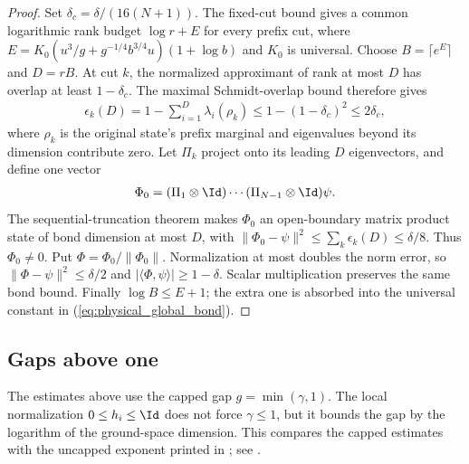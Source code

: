 \begin{proof}
    \leanok
    Set $\delta_c=\delta/(16(N+1))$.
    The fixed-cut bound gives a common logarithmic rank budget
    $\log r+E$ for every prefix cut, where
    $E=K_0(u^3/g+g^{-1/4}b^{3/4}u)(1+\log b)$ and $K_0$ is universal.
    Choose $B=\lceil e^E\rceil$ and $D=rB$.
    At cut $k$, the normalized approximant of rank at most $D$ has overlap
    at least $1-\delta_c$. The maximal Schmidt-overlap bound therefore gives
    \begin{align}
        \epsilon_k(D)=1-\sum_{i=1}^D\lambda_i(\rho_k)
        \le1-(1-\delta_c)^2\le2\delta_c,
        \label{eq:physical_global_prefix_tail}
    \end{align}
    where $\rho_k$ is the original state's prefix marginal and eigenvalues
    beyond its dimension contribute zero.
    Let $\Pi_k$ project onto its leading $D$ eigenvectors, and define one vector
    \begin{align}
        \Phi_0=(\Pi_1\otimes\Id)\cdots(\Pi_{N-1}\otimes\Id)\psi.
        \label{eq:physical_global_projection_product}
    \end{align}
    The sequential-truncation theorem makes $\Phi_0$ an open-boundary matrix
    product state of bond dimension at most $D$, with
    $\|\Phi_0-\psi\|^2\le\sum_k\epsilon_k(D)\le\delta/8$.
    Thus $\Phi_0\ne0$. Put $\Phi=\Phi_0/\|\Phi_0\|$.
    Normalization at most doubles the norm error, so
    $\|\Phi-\psi\|^2\le\delta/2$ and
    $|\langle\Phi,\psi\rangle|\ge1-\delta$.
    Scalar multiplication preserves the same bond bound.
    Finally $\log B\le E+1$; the extra one is absorbed into the universal
    constant in (\ref{eq:physical_global_bond}).
\end{proof}

\subsection{Gaps above one}
\label{sec:physical_dg_large_gap}

The estimates above use the capped gap $g=\min(\gamma,1)$. The local
normalization $0\le h_i\le\Id$ does not force $\gamma\le1$, but it bounds
the gap by the logarithm of the ground-space dimension. This compares the
capped estimates with the uncapped exponent printed in
\cite[Theorem~4.9]{Arad2016RigorousRG}; see
\cite{gap:alvv16_approximation_parameters}.

